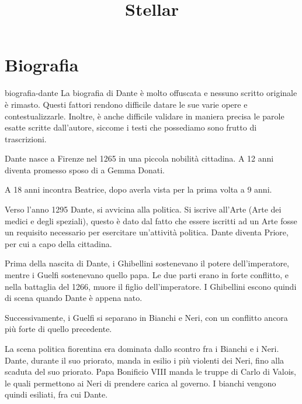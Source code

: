 \documentclass[preview]{standalone}
\begin{document}
\title{Stellar}
\genpage

\section{Biografia}

\begin{snippet}{biografia-dante}
    La biografia di Dante è molto offuscata e nessuno scritto originale è rimasto.
    Questi fattori rendono difficile datare le sue varie opere e contestualizzarle. Inoltre,
    è anche difficile validare in maniera precisa le parole esatte scritte dall'autore, siccome i testi che possediamo
    sono frutto di trascrizioni.
    
    Dante nasce a Firenze nel 1265 in una piccola nobilità cittadina.
    A 12 anni diventa promesso sposo di a Gemma Donati.
    
    A 18 anni incontra Beatrice, dopo averla vista per la prima volta a 9 anni.
    
    Verso l'anno 1295 Dante, si avvicina alla politica.
    Si iscrive all'Arte (Arte dei medici e degli speziali), questo è dato dal fatto che essere iscritti ad un Arte
    fosse un requisito necessario per esercitare un'attività politica. Dante diventa Priore, per cui a capo della cittadina. %
    
    Prima della nascita di Dante, i Ghibellini sostenevano il potere dell'imperatore, mentre i Guelfi sostenevano quello papa.
    Le due parti erano in forte conflitto, e nella battaglia del 1266, muore il figlio dell'imperatore.
    I Ghibellini escono quindi di scena quando Dante è appena nato.
    
    Successivamente, i Guelfi si separano in Bianchi e Neri, con un conflitto ancora più forte di quello precedente.
    
    La scena politica fiorentina era dominata dallo scontro fra i Bianchi e i Neri.
    Dante, durante il suo priorato, manda in esilio i più violenti dei Neri, fino alla scaduta del suo priorato.
    Papa Bonificio VIII manda le truppe di Carlo di Valois, le quali permettono ai Neri di prendere carica al governo.
    I bianchi vengono quindi esiliati, fra cui Dante.
\end{snippet}
\end{document}
